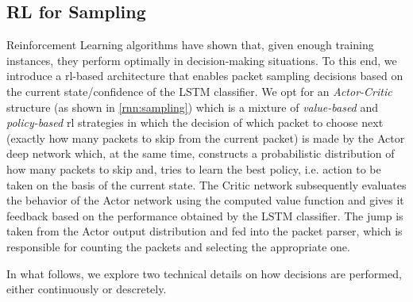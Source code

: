 \documentclass[conference]{IEEEtran}
\begin{document}
\subsection{RL for Sampling}
Reinforcement Learning algorithms have shown that, given enough training instances, they perform optimally in decision-making situations. To this end, we introduce a \gls{rl}-based architecture that enables packet sampling decisions based on the current state/confidence of the LSTM classifier. We opt for an \emph{Actor-Critic} structure (as shown in \autoref{rnn:sampling}) which is a mixture of \emph{value-based} and \emph{policy-based} \gls{rl} strategies in which the decision of which packet to choose next (exactly how many packets to skip from the current packet) is made by the Actor deep network which, at the same time, constructs a probabilistic distribution of how many packets to skip and, tries to learn the best policy, i.e. action to be taken on the basis of the current state. The Critic network subsequently evaluates the behavior of the Actor network using the computed value function and gives it feedback based on the performance obtained by the LSTM classifier. The jump is taken from the Actor output distribution and fed into the packet parser, which is responsible for counting the packets and selecting the appropriate one.

In what follows, we explore two technical details on how decisions are performed, either continuously or descretely. 
\end{document}
